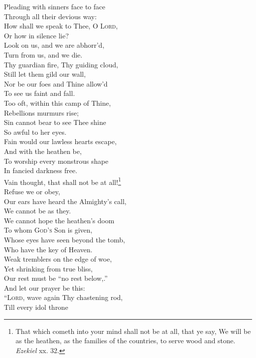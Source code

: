  Pleading with sinners face to face \\
 Through all their devious way: \\
  How shall we speak to Thee, O \textsc{Lord}, \\
 Or how in silence lie? \\
 Look on us, and we are abhorr’d, \\
 Turn from us, and we die. \\
  Thy guardian fire, Thy guiding cloud, \\
 Still let them gild our wall, \\
 Nor be our foes and Thine allow’d \\
 To see us faint and fall. \\
  Too oft, within this camp of Thine, \\
 Rebellions murmurs rise; \\
 Sin cannot bear to see Thee shine \\
 So awful to her eyes. \\
  Fain would our lawless hearts escape, \\
 And with the heathen be, \\
 To worship every monstrous shape \\
 In fancied darkness free. \\
  Vain thought, that shall not be at all!\footnote{That which cometh into your mind shall not be at all, that ye say, We will be as the heathen, as the families of the countries, to serve wood and stone. \emph{Ezekiel} xx. 32.} \\
 Refuse we or obey, \\
 Our ears have heard the Almighty’s call, \\
 We cannot be as they. \\
  We cannot hope the heathen’s doom \\
 To whom \textsc{God’s} Son is given, \\
 Whose eyes have seen beyond the tomb, \\
 Who have the key of Heaven. \\
  Weak tremblers on the edge of woe, \\
 Yet shrinking from true bliss, \\
 Our rest must be “no rest below,.” \\
 And let our prayer be this: \\
  “\textsc{Lord}, wave again Thy chastening rod, \\
 Till every idol throne \\
